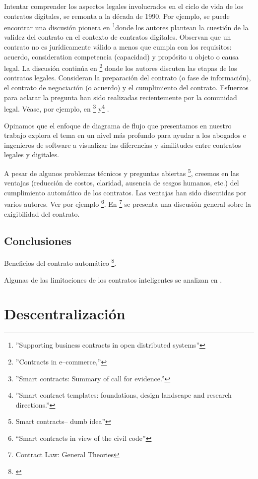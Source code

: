\documentclass[12pt]{report} %
\begin{document}
Intentar comprender los aspectos legales involucrados en el ciclo de vida de los contratos digitales, se remonta a la década de 1990. Por ejemplo, se puede encontrar una discusión pionera en  \footnote{\cite{Zoran1995} ''Supporting business contracts in open distributed systems'' }donde los autores plantean la cuestión de la validez del contrato en el contexto de contratos digitales. Observan que un contrato no es jurídicamente válido a menos que cumpla con los requisitos: acuerdo, consideration  competencia (capacidad) y propósito u objeto o causa legal. La discusión continúa en \footnote{\cite{HansLai2003} ''Contracts in e–commerce,'' } 
donde los autores discuten las etapas de los contratos legales. Consideran la preparación del contrato (o fase de información), el contrato de negociación (o acuerdo) y el cumplimiento del contrato. Esfuerzos para aclarar la pregunta han sido realizadas recientemente por la comunidad legal. Véase, por ejemplo, en \footnote{\cite{LawCommission2020} ''Smart contracts: Summary of call for evidence.'' } y\footnote{\cite{Christopher2019}''Smart contract templates: foundations, design landscape and research directions.'' }  .

Opinamos que el enfoque de diagrama de flujo que presentamos en nuestro trabajo explora el tema en un nivel más profundo para ayudar a los abogados e ingenieros de software a visualizar las diferencias y similitudes entre contratos legales y digitales.

A pesar de algunos problemas técnicos y preguntas abiertas \footnote{\cite{Kieron2017}Smart contracts– dumb idea” }, creemos en las ventajas (reducción de costos, claridad, ausencia de sesgos humanos, etc.) del cumplimiento automático de los contratos. Las ventajas han sido discutidas por varios autores. Ver por ejemplo \footnote{\cite{Monika2019} “Smart contracts in view of the civil code”}. En \footnote{\cite{RichardCraswell1999} Contract Law: General Theories} se presenta una discusión general sobre la exigibilidad del contrato.

\section{Conclusiones}

Beneficios del contrato automático \footnote{\cite{Monika2019}}.

Algunas de las limitaciones de los contratos inteligentes se analizan en .




\chapter{Descentralización}
\label{Descentralización}
\end{document}
